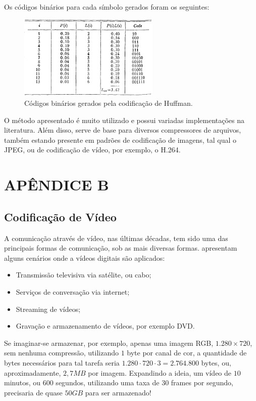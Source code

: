 \documentclass[cic,tc]{iiufrgs}
\begin{document}
Os códigos binários para cada símbolo gerados foram os seguintes:
\begin{figure}[H]
    \caption{Códigos binários gerados pela codificação de Huffman.}
    \begin{center}
        \includegraphics[width=0.6\textwidth]{img/huffmantable.png}
    \end{center}
\end{figure}

O método apresentado é muito utilizado e possui variadas implementações na 
literatura.
Além disso, serve de base para diversos compressores de arquivos, também 
estando presente em padrões de codificação de imagens, tal qual o JPEG, 
ou de codificação de vídeo, por exemplo, o H.264.
\newpage
\chapter*{APÊNDICE B}
\section*{Codificação de Vídeo}
\label{sec:codvideo}
A comunicação através de vídeo, nas últimas décadas, tem sido uma das principais formas
de comunicação, sob as mais diversas formas.
\citet{SullivanH264} apresentam alguns cenários onde a vídeos digitais são aplicados:
\begin{itemize}
    \item Transmissão televisiva via satélite, ou cabo;
    \item Serviços de conversação via internet;
    \item Streaming de vídeos;
    \item Gravação e armazenamento de vídeos, por exemplo DVD.
\end{itemize}

Se imaginar-se armazenar, por exemplo, apenas uma imagem RGB, $1.280\times720$, 
sem nenhuma compressão, utilizando $1$ byte por canal de cor, a quantidade de bytes necessários 
para tal tarefa seria $1.280\cdot720\cdot3 = 2.764.800$ bytes, ou, aproximadamente, $2,7MB$
por imagem.
Expandindo a ideia, um vídeo de $10$ minutos, ou $600$ segundos, 
utilizando uma taxa de $30$ frames por segundo,
precisaria de quase $50GB$ para ser armazenado!
\end{document}
